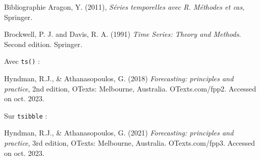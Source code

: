 \documentclass[10pt,french,xcolor=table,color={dvipsnames,usenames},ignorenonframetext,usepdftitle=false,french,handout]{beamer}
\begin{document}
\begin{frame}[fragile]{Bibliographie}
\protect\hypertarget{bibliographie}{}
Aragon, Y. (2011), \emph{Séries temporelles avec R. Méthodes et cas},
Springer.

Brockwell, P. J. and Davis, R. A. (1991) \emph{Time Series: Theory and
Methods}. Second edition. Springer.

Avec \texttt{ts()} :

Hyndman, R.J., \& Athanasopoulos, G. (2018) \emph{Forecasting:
principles and practice}, 2nd edition, OTexts: Melbourne, Australia.
OTexts.com/fpp2. Accessed on oct. 2023.

Sur \texttt{tsibble} :

Hyndman, R.J., \& Athanasopoulos, G. (2021) \emph{Forecasting:
principles and practice}, 3rd edition, OTexts: Melbourne, Australia.
OTexts.com/fpp3. Accessed on oct. 2023.
\end{frame}
\end{document}
